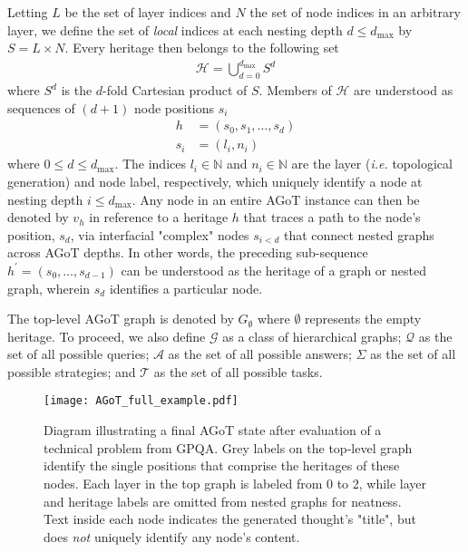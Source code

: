 \documentclass{article}
\begin{document}
Letting $L$ be the set of layer indices and $N$ the set of node indices in an arbitrary layer, we define the set of \textit{local} indices at each nesting depth $d \leq d_\text{max}$ by $S = L \times N$. Every heritage then belongs to the following set
\begin{align}
    \mathcal{H} = \bigcup_{d = 0}^{d_\text{max}} S^d
\end{align}
where $S^d$ is the $d$-fold Cartesian product of $S$. Members of $\mathcal{H}$ are understood as sequences of $(d+1)$ node positions $s_i$
\begin{align}
    h &= (s_0, s_1, \dots, s_{d}) \\
    s_i &= (l_i, n_i)
\end{align}
where $0\leq d \leq d_\text{max}$. The indices $l_i \in \mathbb{N}$ and $n_i \in \mathbb{N}$ are the layer (\textit{i.e.} topological generation) and node label, respectively, which uniquely identify a node at nesting depth $i \leq d_\text{max}$. Any node in an entire AGoT instance can then be denoted by $v_h$ in reference to a heritage $h$ that traces a path to the node's position, $s_d$, via interfacial "complex" nodes $s_{i<d}$ that connect nested graphs across AGoT depths. In other words, the preceding sub-sequence $h^\prime = (s_0,\dots,s_{d-1})$ can be understood as the heritage of a graph or nested graph, wherein $s_d$ identifies a particular node.

The top-level AGoT graph is denoted by $G_{\emptyset}$ where $\emptyset$ represents the empty heritage. To proceed, we also define $\mathcal{G}$ as a class of hierarchical graphs; $\mathcal{Q}$ as the set of all possible queries; $\mathcal{A}$ as the set of all possible answers; $\Sigma$ as the set of all possible strategies; and $\mathcal{T}$ as the set of all possible tasks.

\begin{figure*}[h!]
    \centering
    \texttt{[image: AGoT\_full\_example.pdf]}
    \caption{Diagram illustrating a final AGoT state after evaluation of a technical problem from GPQA. Grey labels on the top-level graph identify the single positions that comprise the heritages of these nodes. Each layer in the top graph is labeled from 0 to 2, while layer and heritage labels are omitted from nested graphs for neatness. Text inside each node indicates the generated thought's "title", but does \textit{not} uniquely identify any node's content.}
    \label{fig:agot_example}
\end{figure*}
\end{document}
